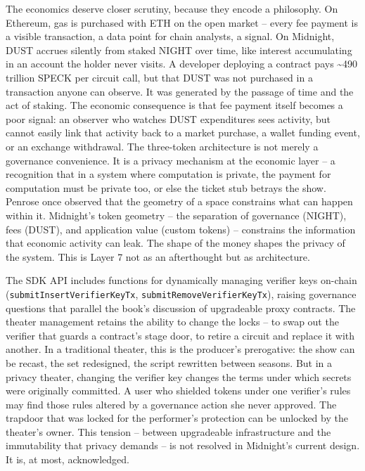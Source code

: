 \documentclass[
  11pt,
  openany]{report}
\begin{document}
The economics deserve closer scrutiny, because they encode a philosophy. On
Ethereum, gas is purchased with ETH on the open market -- every fee payment is a
visible transaction, a data point for chain analysts, a signal. On Midnight,
DUST accrues silently from staked NIGHT over time, like interest accumulating in
an account the holder never visits. A developer deploying a contract pays
\textasciitilde490 trillion SPECK per circuit call, but that DUST was not
purchased in a transaction anyone can observe. It was generated by the passage
of time and the act of staking. The economic consequence is that fee payment
itself becomes a poor signal: an observer who watches DUST expenditures sees
activity, but cannot easily link that activity back to a market purchase, a
wallet funding event, or an exchange withdrawal. The three-token architecture is
not merely a governance convenience. It is a privacy mechanism at the economic
layer -- a recognition that in a system where computation is private, the
payment for computation must be private too, or else the ticket stub betrays the
show. Penrose once observed that the geometry of a space constrains what can
happen within it. Midnight's token geometry -- the separation of governance
(NIGHT), fees (DUST), and application value (custom tokens) -- constrains the
information that economic activity can leak. The shape of the money shapes the
privacy of the system. This is Layer 7 not as an afterthought but as
architecture.

The SDK API includes functions for dynamically managing verifier keys on-chain
(\texttt{submitInsertVerifierKeyTx}, \texttt{submitRemoveVerifierKeyTx}),
raising governance questions that parallel the book's discussion of upgradeable
proxy contracts. The theater management retains the ability to change the locks
-- to swap out the verifier that guards a contract's stage door, to retire a
circuit and replace it with another. In a traditional theater, this is the
producer's prerogative: the show can be recast, the set redesigned, the script
rewritten between seasons. But in a privacy theater, changing the verifier key
changes the terms under which secrets were originally committed. A user who
shielded tokens under one verifier's rules may find those rules altered by a
governance action she never approved. The trapdoor that was locked for the
performer's protection can be unlocked by the theater's owner. This tension --
between upgradeable infrastructure and the immutability that privacy demands --
is not resolved in Midnight's current design. It is, at most, acknowledged.
\end{document}
